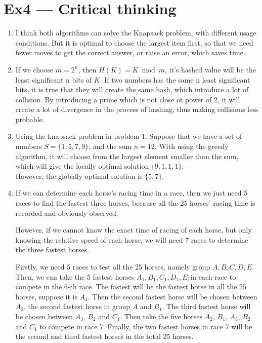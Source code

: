 \documentclass[12pt, a4paper]{article}
\begin{document}
\section*{Ex4 --- Critical thinking}
\begin{enumerate}
    \item I think both algorithms can solve the Knapsack problem, with different usage conditions. 
          But it is optimal to choose the largest item first, 
          so that we need fewer moves to get the correct answer, or raise an error, which saves time.
    
    \item If we choose $m = 2^n$, then $H(K) = K \bmod m$, it's hashed value will be the least significant n bits of $K$. 
          If two numbers has the same n least significant bits, it is true that they will create the same hash, 
          which introduce a lot of collision. By introducing a prime which is not close ot power of 2, 
          it will create a lot of divergence in the process of hashing, thus making collisions less probable.
    
    \item Using the knapsack problem in problem 1. Suppose that we have a set of numbers $S = \{1, 5, 7, 9\}$, 
          and the sum $n = 12$. With using the greedy algorithm, it will choose from the largest element smaller than the sum, 
          which will give the locally optimal solution $\{9,1,1,1\}$.\\
          However, the globally optimal solution is $\{5, 7\}$. 
    
    \item If we can determine each horse's racing time in a race, then we just need 5 races to find the fastest three horses, 
          because all the 25 horses' racing time is recorded and obviously observed.

          However, if we cannot know the exact time of racing of each horse, but only knowing the relative speed of each horse, 
          we will need 7 races to determine the three fastest horses.

          Firstly, we need 5 races to test all the 25 horses, namely group $A, B, C, D, E$. 
          Then, we can take the 5 fastest horses $A_1, B_1, C_1, D_1, E_1$in each race to compete in the 6-th race. 
          The fastest will be the fastest horse in all the 25 horses, suppose it is $A_1$. 
          Then the second fastest horse will be chosen between $A_2$, the second fastest horse in group $A$ and $B_1$. 
          The third fastest horse will be chosen between $A_3$, $B_2$ and $C_1$. 
          Then take the five horses $A_2$, $B_1$, $A_3$, $B_2$ and $C_1$ to compete in race 7. 
          Finally, the two fastest horses in race 7 will be the second and third fastest horses in the total 25 horses.

\end{enumerate}
\end{document}
